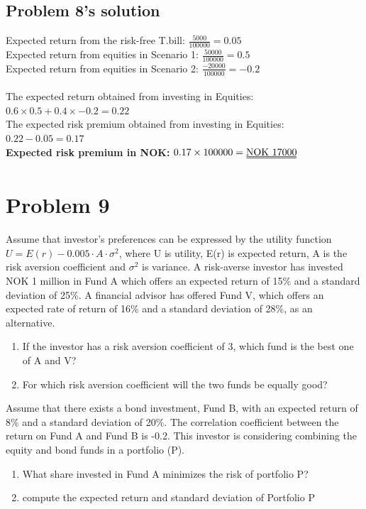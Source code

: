 \documentclass[10]{article}
\begin{document}
\color{blue}
\subsection*{Problem 8's solution}
Expected return from the risk-free T.bill: $\frac{5000}{100000} = 0.05$\\
Expected return from equities in Scenario 1: $\frac{50000}{100000} = 0.5$\\
Expected return from equities in Scenario 2: $\frac{-20000}{100000} = -0.2$\\
\\
The expected return obtained from investing in Equities: $0.6\times 0.5 + 0.4\times -0.2 = 0.22$\\
The expected risk premium obtained from investing in Equities: $0.22 - 0.05 = 0.17$\\
\textbf{Expected risk premium in NOK:} $0.17 \times 100000 = \uuline{\text{NOK}~17000}$



\color{black}
\section*{Problem 9}
Assume that investor’s preferences can be expressed by the utility function $U = E(r) - 0.005 \cdot A\cdot \sigma^2$, where U is utility, E(r) is expected return, A is the risk aversion coefficient and $\sigma^2$ is variance.
A risk-averse investor has invested NOK 1 million in Fund A which offers an expected return of 15\% and a standard deviation of 25\%. A financial advisor has offered Fund V, which offers an expected rate of return of 16\% and a standard deviation of 28\%, as an alternative.
\begin{enumerate}
    \item[a)] If the investor has a risk aversion coefficient of 3, which fund is the best one of A and V?
    \item[b)] For which risk aversion coefficient will the two funds be equally good?
\end{enumerate}
Assume that there exists a bond investment, Fund B, with an expected return of 8\% and a standard deviation of 20\%. The correlation coefficient between the return on Fund A and Fund B is -0.2. This investor is considering combining the equity and bond funds in a portfolio (P). 
\begin{enumerate}
    \item[c)] What share invested in Fund A minimizes the risk of portfolio P?
    \item[d)] compute the expected return and standard deviation of Portfolio P
\end{enumerate}
\end{document}
